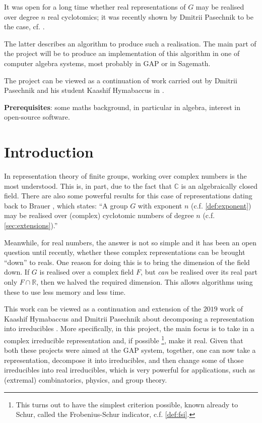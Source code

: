 \documentclass[11pt]{article}
\begin{document}
It was open for a long time whether real representations of $G$ may be realised
over degree $n$ real cyclotomics; it was recently shown by Dmitrii Pasechnik to
be the case, cf. \cite{Pas21}.

The latter describes an algorithm to produce such a realisation. The main part
of the project will be to produce an implementation of this algorithm in one of
computer algebra systems, most probably in GAP or in Sagemath.

The project can be viewed as a continuation of work carried out by Dmitrii
Pasechnik and his student Kaashif Hymabaccus in \cite{Hymabaccus2020}.

\textbf{Prerequisites}: some maths background, in particular in algebra,
interest in open-source software.

\newpage

\tableofcontents

\newpage

\section{Introduction}

In representation theory of finite groups, working over complex numbers is the
most understood. This is, in part, due to the fact that $\mathbb{C}$ is an
algebraically closed field. There are also some powerful results for this case of
representations dating back to Brauer \cite[(10.3)]{ISAACS}, which
states: ``A group $G$ with exponent $n$ (c.f. \cref{def:exponent}) may be
realised over (complex) cyclotomic numbers of degree $n$
(c.f. \cref{sec:extensions}).''

Meanwhile, for real numbers, the answer is not so simple and it has been an open
question until recently, whether these complex representations can be brought
``down'' to reals. One reason for doing this is to bring the dimension of the
field down. If $G$ is realised over a complex field $F$, but \textit{can} be
realised over its real part only $F \cap \mathbb{R}$, then we halved the required
dimension. This allows algorithms using these to use less memory and less time.

This work can be viewed as a continuation and extension of the $2019$ work of
Kaashif Hymabaccus and Dmitrii Pasechnik about decomposing a representation into
irreducibles \cite{Hymabaccus2020}. More specifically, in this project, the main
focus is to take in a complex irreducible representation and, if possible
\footnote{This turns out to have the simplest criterion possible, known already
to Schur, called the Frobenius-Schur indicator, c.f. \cref{def:fsi}.},
make it real. Given that both these projects were aimed at the GAP system,
together, one can now take a representation, decompose it into irreducibles, and
then change some of those irreducibles into real irreducibles, which is very
powerful for applications, such as (extremal) combinatorics, physics, and
group theory.
\end{document}
